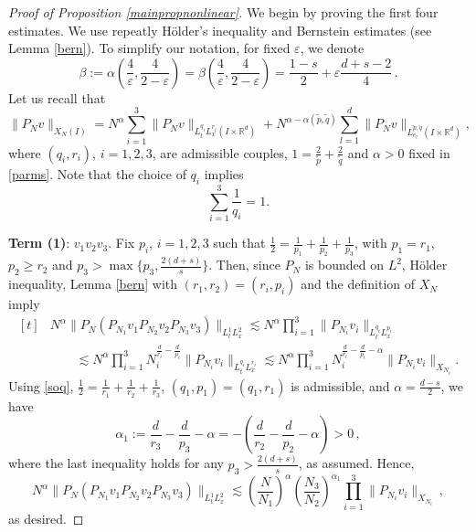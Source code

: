 \documentclass[aihp]{imsart}
\numberwithin{equation}{section}
\theoremstyle{plain}
\theoremstyle{remark}
\newcommand{\R}{\mathbb{R}}
\begin{document}
\begin{proof}[Proof of Proposition \ref{mainpropnonlinear}]
We begin by proving the first four estimates. We use repeatly H\" older's inequality and Bernstein estimates (see Lemma \ref{bern}). To simplify our notation, for fixed $\varepsilon$, we
 denote 
$$
\beta := \alpha \left( \frac{4}{\varepsilon}, \frac{4}{2-\varepsilon}\right) =  \beta \left(\frac{4}{\varepsilon}, \frac{4}{2-\varepsilon}\right) = \dfrac{1-s}{2}+\varepsilon \dfrac{d+s-2}{4} \,.
$$
Let us recall that
$$\|P_N v\|_{X_N (I)}= N^\alpha \sum_{i=1}^{3} \|P_N v\|_{L_t^{q_i} L_x^{r_i} (I\times \R^d)} +N^{\alpha-\alpha(\tilde{p},\tilde{q}) } \sum_{l=1}^d \|P_N v \|_{L_{e_l}^{\tilde{p},\tilde{q} } (I\times \R^d)},$$
where $(q_i ,r_i)$, $i=1,2,3$, are admissible couples, $1= \frac{2}{\tilde{p}} +\frac{2}{\tilde{q}}$ and $\alpha>0$ fixed in \eqref{parms}. Note that the choice of $q_i$ implies 
\begin{equation}\label{soq}
\sum_{i=1}^3 \dfrac{1}{q_i}=1. 
\end{equation}



\textbf{Term (1)}: $v_1 v_2 v_3$. 
Fix $p_i$, $i = 1, 2, 3$ such that $\frac{1}{2}=\frac{1}{p_1}+\frac{1}{p_2} +\frac{1}{p_3} $, with $p_1=r_1$, $p_2 \geq r_2$ and $p_3 > \max\{p_3, \frac{2(d + s)}{s} \}$. 
Then, since $P_N$ is bounded on $L^2$, H\" older
inequality,  Lemma \ref{bern} with $(r_1, r_2) = (r_i, p_i)$ and the definition of $X_N$ imply
\begin{equation*}
\begin{aligned}[t]
& N^\alpha \|P_N (P_{N_1} v_1  P_{N_2} v_2 P_{N_3} v_3) \|_{L_t^{1} L_x^{2}} \lesssim N^\alpha \prod_{i=1}^3 \|P_{N_i} v_i \|_{L_t^{q_i}L_x^{p_i}} \\
&\qquad\lesssim N^\alpha \prod_{i=1}^3 N_i^{\frac{d}{r_i}- \frac{d}{p_i}} \|P_{N_i} v_i \|_{L_t^{q_i}L_x^{r_i}} \lesssim N^\alpha \prod_{i=1}^3 N_i^{\frac{d}{r_i}- \frac{d}{p_i} -\alpha } \|P_{N_i} v_i\|_{X_{N_i}}  .
\end{aligned}
\end{equation*}
Using \eqref{soq}, $\frac{1}{2} = \frac{1}{r_1} + \frac{1}{r_2} + \frac{1}{r_3}$, $(q_1,p_1) = (q_1, r_1)$ is admissible, and $\alpha =\frac{d-s}{2}$, we have
$$\alpha_1 :=  \frac{d}{ r_3} - \frac{d}{p_3} -\alpha = -\left(\frac{d}{ r_2}- \frac{d}{p_2} -\alpha\right) > 0 \,,$$
where the last inequality holds for any $p_3 > \frac{2(d + s)}{s}$, as  assumed. 
Hence,
$$N^\alpha \|P_N (P_{N_1} v_1  P_{N_2} v_2 P_{N_3} v_3) \|_{L_t^{1} L_x^{2}} \lesssim \left(\frac{N}{N_1}\right)^\alpha \left(\frac{N_3}{N_2}\right)^{\alpha_1} \prod_{i=1}^3 \|P_{N_i} v_i \|_{X_{N_i}} \,,$$
as desired.



\end{proof}
\end{document}
